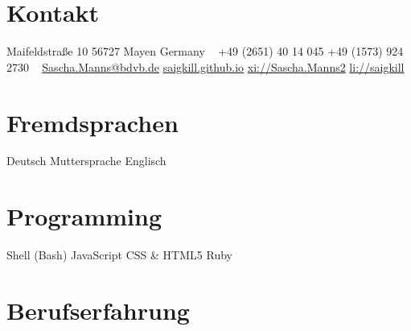 \documentclass[a4paper,latin]{friggeri-cv} %
\begin{document}




\begin{aside} %
\section{Kontakt}
Maifeldstraße 10
56727 Mayen
Germany
~
+49 (2651) 40 14 045
+49 (1573) 924 2730
~
\href{mailto:Sascha.Manns@bdvb.de}{Sascha.Manns@bdvb.de}
\href{http://saigkill.github.io}{saigkill.github.io}
\href{https://www.xing.com/profile/Sascha_Manns2}{xi://Sascha.Manns2}
\href{http://de.linkedin.com/in/saigkill}{li://saigkill} 
\section{Fremdsprachen}
Deutsch Muttersprache
Englisch
\section{Programming}
{Shell (Bash)}
{JavaScript}
{CSS \& HTML5}
{Ruby}
\end{aside}


\section{Berufserfahrung}
\end{document}
